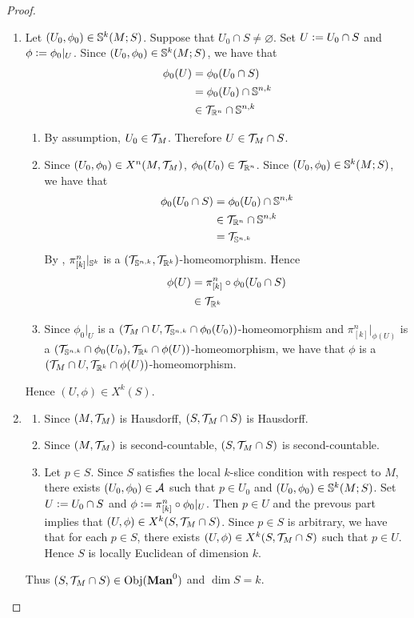 \documentclass{book}
\begin{document}
	\begin{proof}\
		\begin{enumerate}
			\item 
			Let $(U_0, \phi_0) \in \S^k(M; S)$. Suppose that $U_0 \cap S \neq \varnothing$. Set $U \defeq U_0 \cap S$ and $\phi \defeq \phi_0|_U$. Since $(U_0, \phi_0) \in \S^k(M; S)$, we have that 
			\begin{align*}
				\phi_0(U)
				& = \phi_0(U_0 \cap S) \\
				& = \phi_0(U_0) \cap \S^{n,k} \\
				& \in \MT_{\R^n} \cap \S^{n,k}
			\end{align*}
			\begin{enumerate}
				\item By assumption, $U_0 \in \MT_M$. Therefore $U \in \MT_M \cap S$.
				\item Since $(U_0, \phi_0) \in X^n(M, \MT_M)$, $\phi_0(U_0) \in \MT_{\R^n}$. Since $(U_0, \phi_0) \in \S^k(M; S)$, we have that 
				\begin{align*}
					\phi_0(U_0 \cap S) 
					& = \phi_0(U_0) \cap \S^{n,k} \\
					& \in \MT_{\R^n} \cap \S^{n,k} \\
					& = \MT_{\S^{n,k}}
				\end{align*}
				By , $\pi^n_{[k]}|_{\S^k}$ is a $(\MT_{\S^{n,k}}, \MT_{\R^k})$-homeomorphism. Hence 
				\begin{align*}
					\phi(U)
					& = \pi^n_{[k]} \circ \phi_0 (U_0 \cap S) \\
					& \in \MT_{\R^k}
				\end{align*}
				\item Since $\phi_0|_U$ is a $(\MT_M \cap U, \MT_{\S^{n,k}} \cap \phi_0(U_0))$-homeomorphism and $\pi^n_{[k]}|_{\phi(U)}$ is a $(\MT_{\S^{n,k}} \cap \phi_0(U_0), \MT_{\R^k} \cap \phi(U))$-homeomorphism, we have that $\phi$ is a $(\MT_M \cap U, \MT_{\R^k} \cap \phi(U))$-homeomorphism. 
			\end{enumerate}
			Hence $(U, \phi) \in X^k(S)$.
			\item 
			\begin{enumerate}
				\item Since $(M, \MT_M)$ is Hausdorff, $(S, \MT_M \cap S)$ is Hausdorff.
				\item Since $(M, \MT_M)$ is second-countable, $(S, \MT_M \cap S)$ is second-countable.
				\item Let $p \in S$. Since $S$ satisfies the local $k$-slice condition with respect to $M$, there exists $(U_0, \phi_0) \in \MA$ such that $p \in U_0$ and $(U_0, \phi_0) \in \S^k(M; S)$. Set $U \defeq U_0 \cap S$ and $\phi \defeq \pi^n_{[k]} \circ \phi_0|_U$. Then $p \in U$ and the prevous part implies that $(U, \phi) \in X^k(S, \MT_M \cap S)$. Since $p \in S$ is arbitrary, we have that for each $p \in S$, there exists $(U, \phi) \in X^k(S, \MT_M \cap S)$ such that $p \in U$. Hence $S$ is locally Euclidean of dimension $k$. 
			\end{enumerate}
			Thus $(S, \MT_M \cap S) \in \Obj(\bManz)$ and $\dim S = k$.
		\end{enumerate}
	\end{proof}
\end{document}
